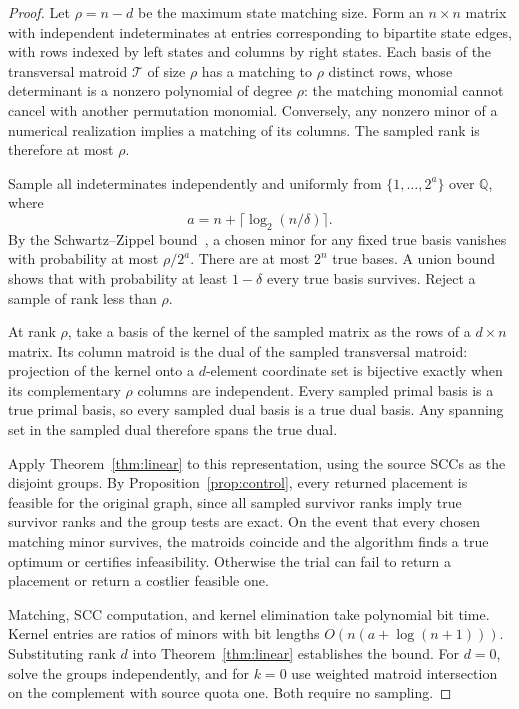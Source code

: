 \documentclass[11pt]{article}
\theoremstyle{definition}
\theoremstyle{remark}\newtheorem{remark}[theorem]{Remark}
\begin{document}
\begin{proof}
Let $\rho=n-d$ be the maximum state matching size.
Form an $n\times n$ matrix with independent indeterminates
at entries corresponding to bipartite state edges, with rows
indexed by left states and columns by right states. Each basis
of the transversal matroid $\mathcal T$ of size $\rho$ has a
matching to $\rho$ distinct rows, whose determinant is a
nonzero polynomial of degree $\rho$: the matching monomial
cannot cancel with another permutation monomial. Conversely,
any nonzero minor of a numerical realization implies a
matching of its columns. The sampled rank is therefore at
most $\rho$.

Sample all indeterminates independently and uniformly from
$\{1,\ldots,2^a\}$ over $\mathbb Q$, where
\[
 a=n+\lceil\log_2(n/\delta)\rceil .
\]
By the Schwartz--Zippel bound~\cite{Schwartz}, a chosen minor
for any fixed true basis vanishes with probability at most
$\rho/2^a$. There are at most $2^n$ true bases. A union bound
shows that with probability at least $1-\delta$ every true
basis survives. Reject a sample of rank less than $\rho$.

At rank $\rho$, take a basis of the kernel of the sampled
matrix as the rows of a $d\times n$ matrix. Its column matroid
is the dual of the sampled transversal matroid: projection
of the kernel onto a $d$-element coordinate set is bijective
exactly when its complementary $\rho$ columns are independent.
Every sampled primal basis is a true primal basis, so every
sampled dual basis is a true dual basis. Any spanning set
in the sampled dual therefore spans the true dual.

Apply Theorem~\ref{thm:linear} to this representation, using
the source SCCs as the disjoint groups. By
Proposition~\ref{prop:control}, every returned placement is
feasible for the original graph, since all sampled survivor
ranks imply true survivor ranks and the group tests are exact.
On the event that every chosen matching minor survives, the
matroids coincide and the algorithm finds a true optimum
or certifies infeasibility. Otherwise the trial can fail to
return a placement or return a costlier feasible one.

Matching, SCC computation, and kernel elimination take
polynomial bit time. Kernel entries are ratios of minors
with bit lengths $O(n(a+\log(n+1)))$. Substituting rank $d$
into Theorem~\ref{thm:linear} establishes the bound.
For $d=0$, solve the groups independently, and for $k=0$
use weighted matroid intersection on the complement with
source quota one. Both require no sampling.
\end{proof}
\end{document}
